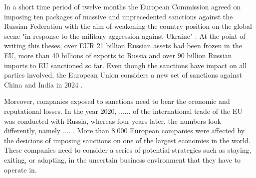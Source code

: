 \documentclass[12pt,a4paper]{article}
\begin{document}
 In a short time period of twelve months the European Commission agreed on imposing ten packages of massive and unprecedented sanctions against the Russian Federation with the aim of weakening the country position on the global scene "in response to the military aggression against Ukraine" \cite{council_of_the_european_union_eu_2024}. At the point of writing this theses, over EUR 21 billion Russian assets had been frozen in the EU, more than 40 billions of exports to Russia and over 90 billion Russian imports to EU sanctioned so far. Even though the sanctions have impact on all parties involved, the European Union considers a new set of sanctions against China and India in 2024 \cite{noauthor_eu_nodate}. 
 
Moreover, companies exposed to sanctions need to bear the economic and reputational losses. In the year 2020, ...... of the international trade of the EU was conducted with Russia, whereas four years later, the numbers look differently, namely .... . More than 8.000 European companies were affected by the desicions of imposing sanctions on one of the largest economies in the world. These companies need to consider a series of potential strategies such as staying, exiting, or adapting, in the uncertain business environment that they have to operate in. 



\end{document}
